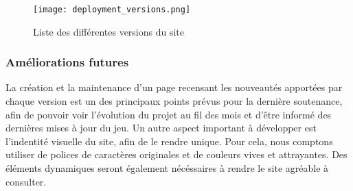     \begin{figure}[hbt!]
        \centering
        \texttt{[image: deployment\_versions.png]}
        \caption{Liste des différentes versions du site}
    \end{figure}

    
    \subsubsection{Améliorations futures}

    La création et la maintenance d'un page recensant les nouveautés apportées par chaque version est un des 
    principaux points prévus pour la dernière soutenance, afin de pouvoir voir l'évolution du projet au fil des 
    mois et d'être informé des dernières mises à jour du jeu. Un autre aspect important à développer est l'indentité
    visuelle du site, afin de le rendre unique. Pour cela,  nous comptons utiliser de polices de caractères originales 
    et de couleurs vives et attrayantes. Des éléments dynamiques seront également nécéssaires à rendre le site agréable 
    à consulter.